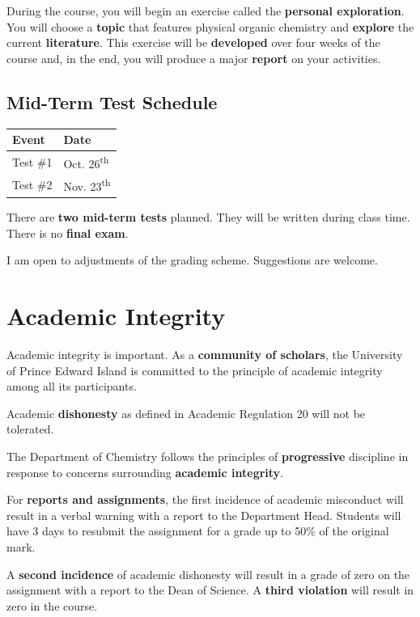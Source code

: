 During the course, you will begin an exercise called the \textbf{personal exploration}. You will choose a \textbf{topic} that features physical organic chemistry and \textbf{explore} the current \textbf{literature}. This exercise will be \textbf{developed} over four weeks of the course and, in the end, you will produce a major \textbf{report} on your activities.

\subsection{Mid-Term Test Schedule}

\begin{center}
\begin{tabular}{ll}
\hline
Event & Date \\
\hline
Test \#1 & Oct. 26\textsuperscript{th} \\
Test \#2 & Nov. 23\textsuperscript{th} \\
\hline
\end{tabular}
\end{center}

There are \textbf{two mid-term tests} planned. They will be written during class time. There is no \textbf{final exam}.

I am open to adjustments of the grading scheme. Suggestions are welcome.

\section{Academic Integrity}

Academic integrity is important. As a \textbf{community of scholars}, the University of Prince Edward Island is committed to the principle of academic integrity among all its participants.

Academic \textbf{dishonesty} as defined in Academic Regulation 20 will not be tolerated.

The Department of Chemistry follows the principles of \textbf{progressive} discipline in response to concerns surrounding \textbf{academic integrity}.

For \textbf{reports and assignments}, the first incidence of academic misconduct will result in a verbal warning with a report to the Department Head. Students will have 3 days to resubmit the assignment for a grade up to 50\% of the original mark.

A \textbf{second incidence} of academic dishonesty will result in a grade of zero on the assignment with a report to the Dean of Science. A \textbf{third violation} will result in zero in the course.

